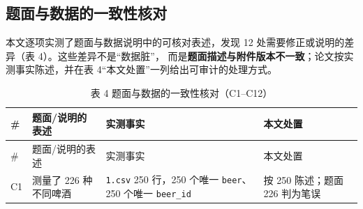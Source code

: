 \documentclass[
  a4paper,12pt]{article}
\begin{document}
\subsection{题面与数据的一致性核对}\label{ux9898ux9762ux4e0eux6570ux636eux7684ux4e00ux81f4ux6027ux6838ux5bf9}

本文逐项实测了题面与数据说明中的可核对表述，发现 12
处需要修正或说明的差异（表 4）。这些差异不是``数据脏''，
而是\textbf{题面描述与附件版本不一致}；论文按实测事实陈述，并在表
4``本文处置''一列给出可审计的处理方式。

\begin{longtable}[]{@{}
  >{\raggedright\arraybackslash}p{}
  >{\raggedright\arraybackslash}p{}
  >{\raggedright\arraybackslash}p{}
  >{\raggedright\arraybackslash}p{}@{}}
\caption{表 4 题面与数据的一致性核对（C1--C12）}\tabularnewline
\toprule\noalign{}
\begin{minipage}[b]{\linewidth}\raggedright
\#
\end{minipage} & \begin{minipage}[b]{\linewidth}\raggedright
题面/说明的表述
\end{minipage} & \begin{minipage}[b]{\linewidth}\raggedright
实测事实
\end{minipage} & \begin{minipage}[b]{\linewidth}\raggedright
本文处置
\end{minipage} \\
\midrule\noalign{}
\endfirsthead
\toprule\noalign{}
\begin{minipage}[b]{\linewidth}\raggedright
\#
\end{minipage} & \begin{minipage}[b]{\linewidth}\raggedright
题面/说明的表述
\end{minipage} & \begin{minipage}[b]{\linewidth}\raggedright
实测事实
\end{minipage} & \begin{minipage}[b]{\linewidth}\raggedright
本文处置
\end{minipage} \\
\midrule\noalign{}
\endhead
\bottomrule\noalign{}
\endlastfoot
C1 & 测量了 226 种不同啤酒 & \texttt{1.csv} 250 行，250 个唯一
\texttt{beer}、250 个唯一 \texttt{beer\_id} & 按 250 陈述；题面 226
判为笔误 \\

\end{longtable}
\end{document}
